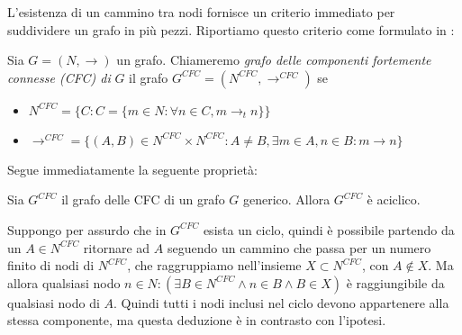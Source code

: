 L'esistenza di un cammino tra nodi fornisce un criterio immediato per suddividere un grafo in più pezzi. Riportiamo questo criterio come formulato in \cite{gentilini}:
\begin{definition}
    Sia $G = (N, \to)$ un grafo. Chiameremo \textit{grafo delle componenti fortemente connesse (CFC) di} $G$ il grafo $G^{CFC} = (N^{CFC}, \to^{CFC})$ se
    \begin{itemize}
        \item $N^{CFC} = \{C : C = \{m \in N : \forall n \in C, m \to_t n\}\}$
        \item $\to^{CFC} = \{(A,B) \in N^{CFC} \times N^{CFC} : A \neq B, \exists m \in A, n \in B : m \to n\}$
    \end{itemize}
\end{definition}
Segue immediatamente la seguente proprietà:
\begin{proposition}
    Sia $G^{CFC}$ il grafo delle CFC di un grafo $G$ generico. Allora $G^{CFC}$ è aciclico.
\end{proposition}
\begin{proof2}
    Suppongo per assurdo che in $G^{CFC}$ esista un ciclo, quindi è possibile partendo da un $A \in N^{CFC}$ ritornare ad $A$ seguendo un cammino che passa per un numero
    finito di nodi di $N^{CFC}$, che raggruppiamo nell'insieme $X \subset N^{CFC}$, con $A \not\in X$. Ma allora qualsiasi nodo
    $n \in N : (\exists B \in N^{CFC} \land n \in B \land B \in X)$ è raggiungibile da qualsiasi nodo di $A$. Quindi tutti i nodi inclusi nel ciclo devono appartenere alla
    stessa componente, ma questa deduzione è in contrasto con l'ipotesi.
\end{proof2}
